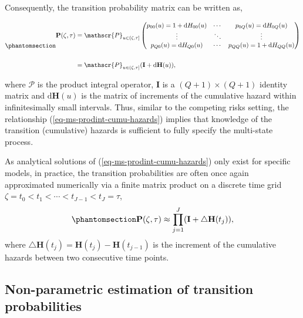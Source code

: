 \documentclass[
  letterpaper,
  krantz2]{style/krantz}
\begin{document}
Consequently, the transition probability matrix can be written as,

\begin{equation}\phantomsection\label{eq-ms-prodint-cumu-hazards}{
\begin{aligned}
\mathbf{P}(\zeta, \tau)
                        &= \mathscr{P}_{u \in (\zeta, \tau]}
  \begin{pmatrix}
    p_{00}(u) = 1 + \mathrm{d}H_{00}(u) & \cdots & p_{0Q}(u) = \mathrm{d}H_{0Q}(u)\\
    \vdots                  & \ddots & \vdots\\
    p_{Q0}(u) =  \mathrm{d}H_{Q0}(u)     & \cdots & p_{QQ}(u) = 1 + \mathrm{d}H_{QQ}(u)\\
  \end{pmatrix}\\
  & \ \\
  & =  \mathscr{P}_{u \in (\zeta, \tau]}(\mathbf{I} + \mathrm{d}\mathbf{H}(u)),\\
\end{aligned}
}\end{equation}

where \(\mathscr{P}\) is the product integral operator, \(\mathbf{I}\)
is a \((Q+1) \times (Q+1)\) identity matrix and
\(\mathrm{d}\mathbf{H}(u)\) is the matrix of increments of the
cumulative hazard within infinitesimally small intervals. Thus, similar
to the competing risks setting, the relationship
(\ref{eq-ms-prodint-cumu-hazards}) implies that knowledge of the
transition (cumulative) hazards is sufficient to fully specify the
multi-state process.

As analytical solutions of (\ref{eq-ms-prodint-cumu-hazards}) only exist
for specific models, in practice, the transition probabilities are often
once again approximated numerically via a finite matrix product on a
discrete time grid
\(\zeta = t_0 < t_1 < \cdots < t_{J-1} < t_{J} = \tau\),
\begin{equation}\phantomsection\label{eq-ms-prodint-approx}{
\mathbf{P}(\zeta, \tau) \approx \prod_{j=1}^{J}(\mathbf{I} + \triangle\mathbf{H}(t_{j})),
}\end{equation} where
\(\triangle \mathbf{H}(t_{j}) = \mathbf{H}(t_{j}) - \mathbf{H}(t_{j-1})\)
is the increment of the cumulative hazards between two consecutive time
points.

\subsection{Non-parametric estimation of transition
probabilities}\label{sec-ms-aalen-johansen}
\end{document}
